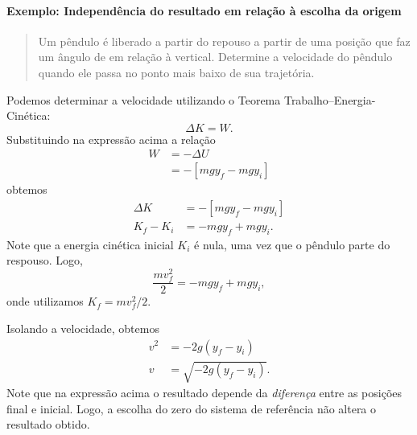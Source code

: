 \paragraph{Exemplo: Independência do resultado em relação à escolha da origem}

\begin{quote}
    Um pêndulo é liberado a partir do repouso a partir de uma posição que faz um ângulo de  em relação à vertical. Determine a velocidade do pêndulo quando ele passa no ponto mais baixo de sua trajetória.
\end{quote}

Podemos determinar a velocidade utilizando o Teorema Trabalho--Energia-Cinética:
\begin{equation}
    \Delta K = W.
\end{equation}
%
Substituindo na expressão acima a relação
\begin{align}
    W &= - \Delta U \\
    &= - [mgy_f - mgy_i]
\end{align}
%
obtemos
\begin{align}
    \Delta K &= -[mgy_f - mgy_i] \\
    K_f - K_i &= -mgy_f + mgy_i.
\end{align}
%
Note que a energia cinética inicial $K_i$ é nula, uma vez que o pêndulo parte do respouso. Logo,
\begin{equation}
    \frac{mv_f^2}{2} = -mgy_f + mgy_i,
\end{equation}
%
onde utilizamos $K_f = mv_f^2/2$.

Isolando a velocidade, obtemos
\begin{align}
    v^2 &= -2g(y_f - y_i) \\
    v &= \sqrt{-2g(y_f - y_i)}.
\end{align}
%
Note que na expressão acima o resultado depende da \emph{diferença} entre as posições final e inicial. Logo, a escolha do zero do sistema de referência não altera o resultado obtido.

